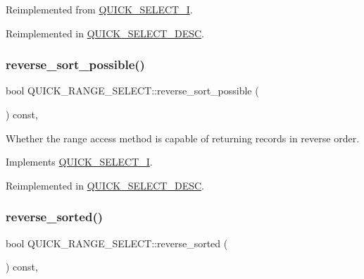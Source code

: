 Reimplemented from \mbox{\hyperlink{classQUICK__SELECT__I}{Q\+U\+I\+C\+K\+\_\+\+S\+E\+L\+E\+C\+T\+\_\+I}}.



Reimplemented in \mbox{\hyperlink{classQUICK__SELECT__DESC_a6ba03676b457b888636ee10c8a77bf7e}{Q\+U\+I\+C\+K\+\_\+\+S\+E\+L\+E\+C\+T\+\_\+\+D\+E\+SC}}.

\mbox{\label{classQUICK__RANGE__SELECT_a91c847083168b315d7a92d7e2e1d5485}} 
\subsubsection{\texorpdfstring{reverse\+\_\+sort\+\_\+possible()}{reverse\_sort\_possible()}}
{\footnotesize\ttfamily bool Q\+U\+I\+C\+K\+\_\+\+R\+A\+N\+G\+E\+\_\+\+S\+E\+L\+E\+C\+T\+::reverse\+\_\+sort\+\_\+possible (\begin{DoxyParamCaption}{ }\end{DoxyParamCaption}) const\hspace{0.3cm}{\ttfamily [inline]}, {\ttfamily [virtual]}}

Whether the range access method is capable of returning records in reverse order. 

Implements \mbox{\hyperlink{classQUICK__SELECT__I_a485c91ca6490bcf1de2eed5a7181a800}{Q\+U\+I\+C\+K\+\_\+\+S\+E\+L\+E\+C\+T\+\_\+I}}.



Reimplemented in \mbox{\hyperlink{classQUICK__SELECT__DESC_a2ac3395790181ce6e03646506650db69}{Q\+U\+I\+C\+K\+\_\+\+S\+E\+L\+E\+C\+T\+\_\+\+D\+E\+SC}}.

\mbox{\label{classQUICK__RANGE__SELECT_a4673131942deb7ef48be474cfc4030e9}} 
\subsubsection{\texorpdfstring{reverse\+\_\+sorted()}{reverse\_sorted()}}
{\footnotesize\ttfamily bool Q\+U\+I\+C\+K\+\_\+\+R\+A\+N\+G\+E\+\_\+\+S\+E\+L\+E\+C\+T\+::reverse\+\_\+sorted (\begin{DoxyParamCaption}{ }\end{DoxyParamCaption}) const\hspace{0.3cm}{\ttfamily [inline]}, {\ttfamily [virtual]}}

